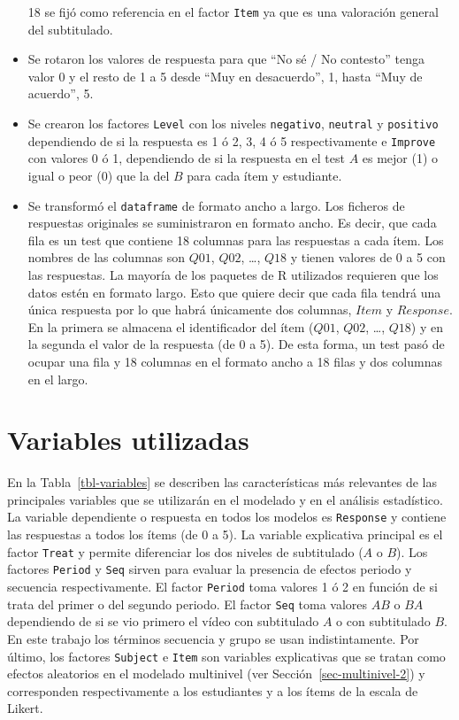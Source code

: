 \documentclass[
  12pt,
  a4paper,
  extrafontsizes,
  onecolumn,
  openright,
  table]{memoir}
\begin{document}
\begin{itemize}
  18 se fijó como referencia en el factor \texttt{Item} ya que es una
  valoración general del subtitulado.
\item
  Se rotaron los valores de respuesta para que \enquote{No sé / No
  contesto} tenga valor 0 y el resto de 1 a 5 desde \enquote{Muy en
  desacuerdo}, 1, hasta \enquote{Muy de acuerdo}, 5.
\item
  Se crearon los factores \texttt{Level} con los niveles
  \texttt{negativo}, \texttt{neutral} y \texttt{positivo} dependiendo de
  si la respuesta es 1 ó 2, 3, 4 ó 5 respectivamente e \texttt{Improve}
  con valores 0 ó 1, dependiendo de si la respuesta en el test \(A\) es
  mejor (1) o igual o peor (0) que la del \(B\) para cada ítem y
  estudiante.
\item
  Se transformó el \texttt{dataframe} de formato ancho a largo. Los
  ficheros de respuestas originales se suministraron en formato ancho.
  Es decir, que cada fila es un test que contiene 18 columnas para las
  respuestas a cada ítem. Los nombres de las columnas son \(Q01\),
  \(Q02\), \ldots, \(Q18\) y tienen valores de 0 a 5 con las respuestas.
  La mayoría de los paquetes de R utilizados requieren que los datos
  estén en formato largo. Esto que quiere decir que cada fila tendrá una
  única respuesta por lo que habrá únicamente dos columnas, \(Item\) y
  \(Response\). En la primera se almacena el identificador del ítem
  (\(Q01\), \(Q02\), \ldots, \(Q18\)) y en la segunda el valor de la
  respuesta (de 0 a 5). De esta forma, un test pasó de ocupar una fila y
  18 columnas en el formato ancho a 18 filas y dos columnas en el largo.
\end{itemize}

\hypertarget{variables-utilizadas}{%
\section{Variables utilizadas}\label{variables-utilizadas}}

En la Tabla~\ref{tbl-variables} se describen las características más
relevantes de las principales variables que se utilizarán en el modelado
y en el análisis estadístico. La variable dependiente o respuesta en
todos los modelos es \texttt{Response} y contiene las respuestas a todos
los ítems (de 0 a 5). La variable explicativa principal es el factor
\texttt{Treat} y permite diferenciar los dos niveles de subtitulado
(\(A\) o \(B\)). Los factores \texttt{Period} y \texttt{Seq} sirven para
evaluar la presencia de efectos periodo y secuencia respectivamente. El
factor \texttt{Period} toma valores 1 ó 2 en función de si trata del
primer o del segundo periodo. El factor \texttt{Seq} toma valores \(AB\)
o \(BA\) dependiendo de si se vio primero el vídeo con subtitulado \(A\)
o con subtitulado \(B\). En este trabajo los términos secuencia y grupo
se usan indistintamente. Por último, los factores \texttt{Subject} e
\texttt{Item} son variables explicativas que se tratan como efectos
aleatorios en el modelado multinivel (ver
Sección~\ref{sec-multinivel-2}) y corresponden respectivamente a los
estudiantes y a los ítems de la escala de Likert.
\end{document}
